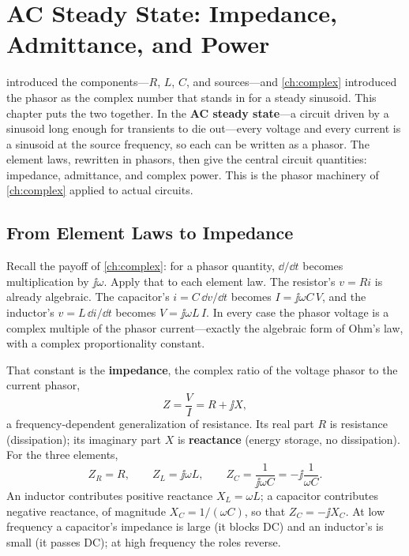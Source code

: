 \chapter{AC Steady State: Impedance, Admittance, and Power}
\label{ch:ac}
 introduced the components---\(R\), \(L\), \(C\), and
sources---and \cref{ch:complex} introduced the phasor as the complex number that
stands in for a steady sinusoid. This chapter puts the two together. In the
\textbf{AC steady state}---a circuit driven by a sinusoid long enough for
transients to die out---every voltage and every current is a sinusoid at the
source frequency, so each can be written as a phasor. The element laws, rewritten
in phasors, then give the central circuit quantities: impedance, admittance, and
complex power. This is the phasor machinery of \cref{ch:complex} applied to actual
circuits.

\section{From Element Laws to Impedance}
Recall the payoff of \cref{ch:complex}: for a phasor quantity, \(\dd/\dd t\)
becomes multiplication by \(\jj\omega\). Apply that to each element law. The
resistor's \(v=Ri\) is already algebraic. The capacitor's \(i=C\,\dd v/\dd t\)
becomes \(I=\jj\omega C\,V\), and the inductor's \(v=L\,\dd i/\dd t\) becomes
\(V=\jj\omega L\,I\). In every case the phasor voltage is a complex multiple of
the phasor current---exactly the algebraic form of Ohm's law, with a complex
proportionality constant.

That constant is the \textbf{impedance}, the complex ratio of the voltage phasor
to the current phasor,
\[
Z=\frac{V}{I}=R+\jj X,
\]
a frequency-dependent generalization of resistance. Its real part \(R\) is
resistance (dissipation); its imaginary part \(X\) is \textbf{reactance} (energy
storage, no dissipation). For the three elements,
\[
Z_R=R,\qquad
Z_L=\jj\omega L,\qquad
Z_C=\frac{1}{\jj\omega C}=-\jj\frac{1}{\omega C}.
\]
An inductor contributes positive reactance \(X_L=\omega L\); a capacitor
contributes negative reactance, of magnitude \(X_C=1/(\omega C)\), so that
\(Z_C=-\jj X_C\). At low frequency a capacitor's impedance is large
(it blocks DC) and an inductor's is small (it passes DC); at high frequency the
roles reverse.

